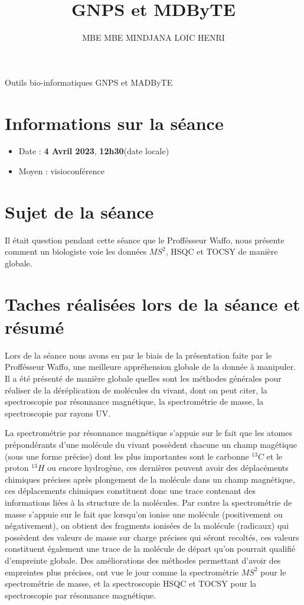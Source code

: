 \documentclass[12pt, french, latin.medieval, a4paper]{report}
\author{MBE MBE MINDJANA LOIC HENRI}
\title{GNPS et MDByTE}
\begin{document}
    
    \pagecouverture
    {Outils bio-informatiques GNPS et MADByTE}
    {}
    \tableofcontents
    \vspace{20cm}

    \section{Informations sur la séance}
    \begin{itemize}
        \item Date : \textbf{4 Avril 2023}, \textbf{12h30}(date locale)
        \item Moyen : visioconférence
    \end{itemize}
    
    \section{Sujet de la séance}
    Il était question pendant cette séance que le Proffésseur Waffo, nous présente comment un biologiste voie les données $MS^{2}$, HSQC et TOCSY de manière globale.
    
    \section{Taches réalisées lors de la séance et résumé}
    Lors de la séance nous avons eu par le biais de la présentation faite par le Proffésseur Waffo, une meilleure appréhension globale de la donnée à manipuler.
    Il a été présenté de manière globale quelles sont les méthodes générales pour réaliser de la déréplication de molécules du vivant, dont on peut citer, la spectroscopie par résonnance magnétique, la spectrométrie de masse, la spectroscopie par rayons UV. 

    
    La spectrométrie par résonnance magnétique s'appuie sur le fait que les atomes prépondérants d'une molécule du vivant possèdent chacune un champ magétique (sous une forme précise) dont les plus importantes sont le carbonne $^{13}C$ et le proton $^{13}H$ ou encore hydrogène, ces dernières peuvent avoir des déplacéments chimiques précises après plongement de la molécule dans un champ magnétique, ces déplacements chimiques constituent donc une trace contenant des informations liées à la structure de la molécules. Par contre la spectrométrie de masse s'appuie sur le fait que lorsqu'on ionise une molécule (positivement ou négativement), on obtient des fragments ionisées de la molécule (radicaux) qui possèdent des valeurs de masse sur charge précises qui séront recoltés, ces valeurs constituent également une trace de la molécule de départ qu'on pourrait qualifié d'empreinte globale. Des améliorations des méthodes permettant d'avoir des empreintes plus précises, ont vue le jour comme la spectrométrie $MS^{2}$ pour le spectrométrie de masse, et la spectroscopie HSQC et TOCSY pour la spectroscopie par résonnance magnétique.
\end{document}
